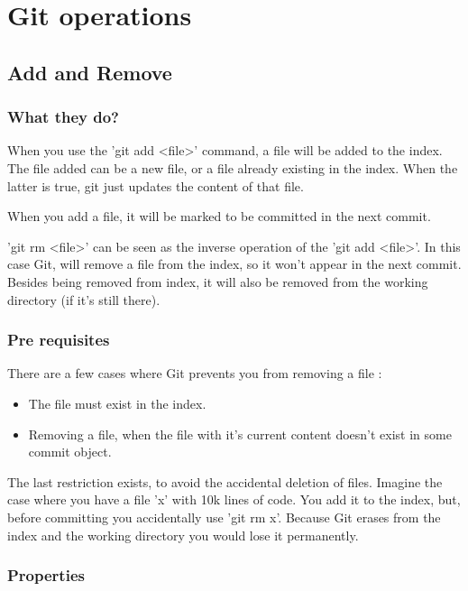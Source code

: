 \section{Git operations}

\subsection{Add and Remove}

\subsubsection{What they do?}

When you use the 'git add <file>' command, a file will be
added to the index. The file added can be a new file, or 
a file already existing in the index. When the latter is true, 
git just updates the content of that file. \par
When you add a file, it will be marked to be committed in the next
commit. \par
'git rm <file>' can be seen as the inverse operation of the 'git add <file>'.
In this case Git, will remove a file from the index, so it won't appear in the
next commit. Besides being removed from index, it will also be removed from the 
working directory (if it's still there). \par

\subsubsection{Pre requisites}

There are a few cases where Git prevents you from removing a file : 
\begin{itemize}
\item The file must exist in the index.
\item Removing a file, when the file with it's current content 
doesn't exist in some commit object.
\end{itemize}
The last restriction exists, to avoid the accidental deletion of files. Imagine the
case where you have a file 'x' with 10k lines of code. You add it to the index,
but, before committing you accidentally use 'git rm x'. Because Git erases from
the index and the working directory you would lose it permanently.

\subsubsection{Properties}

